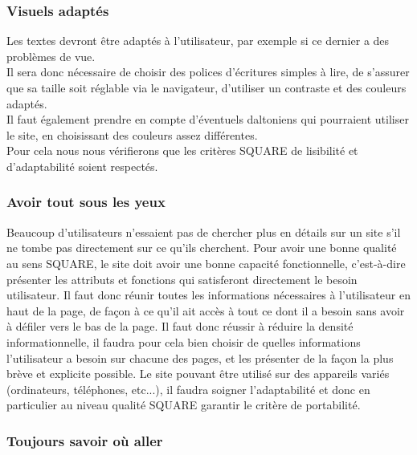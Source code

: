 \documentclass[a4paper,11pt]{article}
\begin{document}
\subsubsection{Visuels adaptés}

Les textes devront être adaptés à l’utilisateur, par exemple si ce dernier a des problèmes de vue.\\

Il sera donc nécessaire de choisir des polices d’écritures simples à lire, de s’assurer que sa taille soit
réglable via le navigateur, d’utiliser un contraste et des couleurs adaptés.\\

Il faut également prendre en compte d’éventuels daltoniens qui pourraient utiliser le site, en
choisissant des couleurs assez différentes.\\

Pour cela nous nous vérifierons que les critères SQUARE de lisibilité et d’adaptabilité soient respectés.\\

\subsubsection{Avoir tout sous les yeux}

Beaucoup d’utilisateurs n’essaient pas de chercher plus en détails sur un site s’il ne tombe pas
directement sur ce qu’ils cherchent. Pour avoir une bonne qualité au sens SQUARE, le site doit avoir
une bonne capacité fonctionnelle, c'est-à-dire présenter les attributs et fonctions qui satisferont
directement le besoin utilisateur. Il faut donc réunir toutes les informations nécessaires à l’utilisateur
en haut de la page, de façon à ce qu’il ait accès à tout ce dont il a besoin sans avoir à défiler vers le
bas de la page. Il faut donc réussir à réduire la densité informationnelle, il faudra pour cela bien choisir
de quelles informations l’utilisateur a besoin sur chacune des pages, et les présenter de la façon la
plus brève et explicite possible. Le site pouvant être utilisé sur des appareils variés (ordinateurs,
téléphones, etc...), il faudra soigner l’adaptabilité et donc en particulier au niveau qualité SQUARE
garantir le critère de portabilité.\\

\subsubsection{Toujours savoir où aller}
\end{document}

